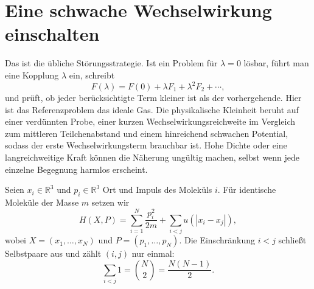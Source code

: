 \section{Eine schwache Wechselwirkung einschalten}

\begin{classroomqa}
\end{classroomqa}

Das ist die übliche Störungsstrategie. Ist ein Problem für \(\lambda=0\) lösbar, führt man eine Kopplung \(\lambda\) ein, schreibt
\begin{equation}
 F(\lambda)=F(0)+\lambda F_1+\lambda^2F_2+\cdots,
 \label{eq:sm6-perturbative-template}
\end{equation}
und prüft, ob jeder berücksichtigte Term kleiner ist als der vorhergehende. Hier ist das Referenzproblem das ideale Gas. Die physikalische Kleinheit beruht auf einer verdünnten Probe, einer kurzen Wechselwirkungsreichweite im Vergleich zum mittleren Teilchenabstand und einem hinreichend schwachen Potential, sodass der erste Wechselwirkungsterm brauchbar ist. Hohe Dichte oder eine langreichweitige Kraft können die Näherung ungültig machen, selbst wenn jede einzelne Begegnung harmlos erscheint.

Seien \(x_i\in\mathbb R^3\) und \(p_i\in\mathbb R^3\) Ort und Impuls des Moleküls \(i\). Für identische Moleküle der Masse \(m\) setzen wir
\begin{equation}
 H(X,P)=
 \sum_{i=1}^{N}\frac{p_i^2}{2m}
 +\sum_{i<j}u\!\left(|x_i-x_j|\right),
 \label{eq:sm6-interacting-hamiltonian}
\end{equation}
wobei \(X=(x_1,\ldots,x_N)\) und \(P=(p_1,\ldots,p_N)\). Die Einschränkung \(i<j\) schließt Selbstpaare aus und zählt \((i,j)\) nur einmal:
\begin{equation}
 \sum_{i<j}1=\binom{N}{2}=\frac{N(N-1)}{2}.
 \label{eq:sm6-pair-count}
\end{equation}

\begin{classroomqa}
\end{classroomqa}

